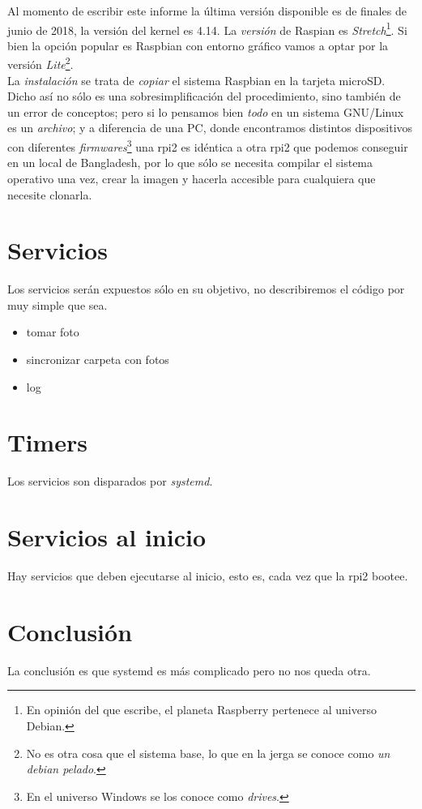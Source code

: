 \documentclass[10pt,a4paper]{article}
\begin{document}
Al momento de escribir este informe la \'ultima versi\'on disponible es de finales de junio de 2018, la versi\'on del kernel es 4.14. La \emph{versi\'on} de Raspian es \emph{Stretch}\footnote{En opini\'on del que escribe, el planeta Raspberry pertenece al universo Debian.}. Si bien la opci\'on popular es Raspbian con entorno gr\'afico vamos a optar por la versi\'on \emph{Lite}\footnote{No es otra cosa que el sistema base, lo que en la jerga se conoce como \emph{un debian pelado}.}.\\

La \emph{instalaci\'on} se trata de \emph{copiar} el sistema Raspbian en la tarjeta microSD. Dicho as\'i no s\'olo es una sobresimplificaci\'on del procedimiento, sino tambi\'en de un error de conceptos; pero si lo pensamos bien \emph{todo} en un sistema GNU/Linux es un \emph{archivo}; y a diferencia de una PC, donde encontramos distintos dispositivos con diferentes \emph{firmwares}\footnote{En el universo Windows se los conoce como \emph{drives}.} una rpi2 es id\'entica a otra rpi2 que podemos conseguir en un local de Bangladesh, por lo que s\'olo se necesita compilar el sistema operativo una vez, crear la imagen y hacerla accesible para cualquiera que necesite clonarla.\\

\section{Servicios}

Los servicios ser\'an expuestos s\'olo en su objetivo, no describiremos el c\'odigo por muy simple que sea.
\begin{itemize}
    \item tomar foto
    \item sincronizar carpeta con fotos
    \item log
\end{itemize}

\section{Timers}

Los servicios son disparados por \emph{systemd}.

\section{Servicios al inicio}

Hay servicios que deben ejecutarse al inicio, esto es, cada vez que la rpi2 bootee.

\section{Conclusi\'on}

La conclusi\'on es que systemd es m\'as complicado pero no nos queda otra.
\end{document}
